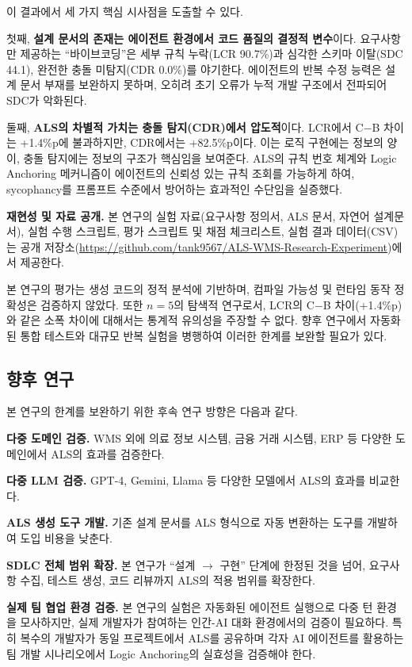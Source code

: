 \documentclass[conference]{IEEEtran}
\begin{document}
이 결과에서 세 가지 핵심 시사점을 도출할 수 있다.

첫째, \textbf{설계 문서의 존재는 에이전트 환경에서 코드 품질의 결정적 변수}이다. 요구사항만 제공하는 ``바이브코딩''은 세부 규칙 누락(LCR 90.7\%)과 심각한 스키마 이탈(SDC 44.1), 완전한 충돌 미탐지(CDR 0.0\%)를 야기한다. 에이전트의 반복 수정 능력은 설계 문서 부재를 보완하지 못하며, 오히려 초기 오류가 누적 개발 구조에서 전파되어 SDC가 악화된다.

둘째, \textbf{ALS의 차별적 가치는 충돌 탐지(CDR)에서 압도적}이다. LCR에서 C$-$B 차이는 +1.4\%p에 불과하지만, CDR에서는 +82.5\%p이다. 이는 로직 구현에는 정보의 양이, 충돌 탐지에는 정보의 구조가 핵심임을 보여준다. ALS의 규칙 번호 체계와 Logic Anchoring 메커니즘이 에이전트의 신뢰성 있는 규칙 조회를 가능하게 하여, sycophancy를 프롬프트 수준에서 방어하는 효과적인 수단임을 실증했다.


\textbf{재현성 및 자료 공개.} 본 연구의 실험 자료(요구사항 정의서, ALS 문서, 자연어 설계문서), 실험 수행 스크립트, 평가 스크립트 및 채점 체크리스트, 실험 결과 데이터(CSV)는 공개 저장소(\url{https://github.com/tank9567/ALS-WMS-Research-Experiment})에서 제공한다.

본 연구의 평가는 생성 코드의 정적 분석에 기반하며, 컴파일 가능성 및 런타임 동작 정확성은 검증하지 않았다. 또한 $n=5$의 탐색적 연구로서, LCR의 C$-$B 차이(+1.4\%p)와 같은 소폭 차이에 대해서는 통계적 유의성을 주장할 수 없다. 향후 연구에서 자동화된 통합 테스트와 대규모 반복 실험을 병행하여 이러한 한계를 보완할 필요가 있다.

\subsection{향후 연구}

본 연구의 한계를 보완하기 위한 후속 연구 방향은 다음과 같다.

\textbf{다중 도메인 검증.} WMS 외에 의료 정보 시스템, 금융 거래 시스템, ERP 등 다양한 도메인에서 ALS의 효과를 검증한다.

\textbf{다중 LLM 검증.} GPT-4, Gemini, Llama 등 다양한 모델에서 ALS의 효과를 비교한다.

\textbf{ALS 생성 도구 개발.} 기존 설계 문서를 ALS 형식으로 자동 변환하는 도구를 개발하여 도입 비용을 낮춘다.

\textbf{SDLC 전체 범위 확장.} 본 연구가 ``설계 $\rightarrow$ 구현'' 단계에 한정된 것을 넘어, 요구사항 수집, 테스트 생성, 코드 리뷰까지 ALS의 적용 범위를 확장한다.

\textbf{실제 팀 협업 환경 검증.} 본 연구의 실험은 자동화된 에이전트 실행으로 다중 턴 환경을 모사하지만, 실제 개발자가 참여하는 인간-AI 대화 환경에서의 검증이 필요하다. 특히 복수의 개발자가 동일 프로젝트에서 ALS를 공유하며 각자 AI 에이전트를 활용하는 팀 개발 시나리오에서 Logic Anchoring의 실효성을 검증해야 한다.
\end{document}
